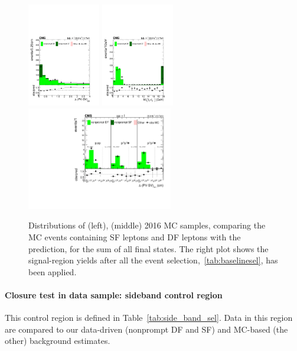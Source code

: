 \begin{figure}[h!]
  \centering
  \includegraphics[clip,trim=0.cm 0.cm 0.5cm 0.5cm,height=4.5cm]{Figures/c6/backgrounds/mc_closure/mu_DeltaPV_SV_2D_zomm__0.pdf}
  \includegraphics[clip,trim=0.cm 0.cm 0.5cm 0.5cm,height=4.5cm]{Figures/c6/backgrounds/mc_closure/mu_M_ll_l2_l3_zoom__0.pdf}
  \includegraphics[clip,trim=0.5cm 0.5cm 0.5cm 0.5cm,height=4.5cm]{Figures/c6/backgrounds/mc_closure/mu_SR__final.pdf}
  \caption{Distributions of \Deltwod (left), \mtwol (middle)
    2016 \ttbar MC samples,
    comparing the MC events containing SF leptons
    and DF leptons with the
    prediction, for the sum of all final states.
    The right plot shows the signal-region yields after all the event
    selection,~\ref{tab:baselinesel}, has been applied.}
  \label{fig:mcClosure}
\end{figure}

 \paragraph{Closure test in data sample: sideband control region}\label{sec:llsidebandcr}
This control region is defined in Table~\ref{tab:side_band_sel}.
Data in this region are compared to our data-driven (nonprompt DF and
SF) and MC-based (the other) background estimates.

